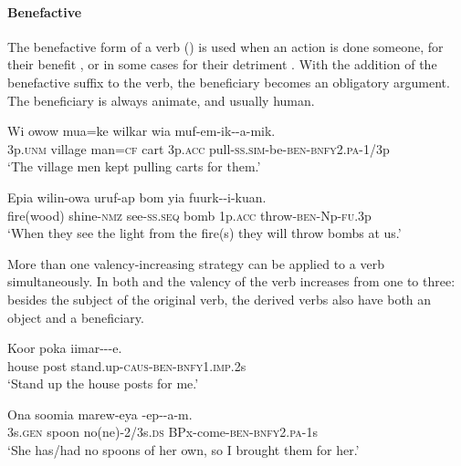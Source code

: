 \paragraph{Benefactive}\label{sec:3.8.4.3.2}
{}
The benefactive form of a verb () is used when an action is done someone, for their benefit , or in some cases for their detriment . With the addition of the benefactive suffix to the verb, the beneficiary becomes an obligatory argument. The beneficiary is always animate, and usually human. 

\ea%
\label{ex:3:x1004}
\gll Wi owow mua=ke wilkar wia muf-em-ik--a-mik.\\
3p.\textsc{unm} village man=\textsc{cf} cart 3p.\textsc{acc} pull-\textsc{ss}.\textsc{sim}-be-\textsc{ben}-\textsc{bnfy}2.\textsc{pa}-1/3p\\
\glt`The village men kept pulling carts for them.'
\z

\ea%
\label{ex:3:x1005}
\gll Epia wilin-owa uruf-ap bom yia fuurk--i-kuan.\\
fire(wood) shine-\textsc{nmz} see-\textsc{ss}.\textsc{seq} bomb 1p.\textsc{acc} throw-\textsc{ben}-Np-\textsc{fu}.3p\\
\glt`When they see the light from the fire(s) they will throw bombs at us.'
\z

More than one valency-increasing strategy can be applied to a verb simultaneously. In both  and  the valency of the verb increases from one to three: besides the subject of the original verb, the derived verbs also have both an object and a beneficiary.

\ea%
\label{ex:3:x1007}
\gll Koor poka iimar---e. \\
house post stand.up-\textsc{caus}-\textsc{ben}-\textsc{bnfy}1.\textsc{imp}.2s\\
\glt`Stand up the house posts for me.'
\z

\ea%
\label{ex:3:x1008}
\gll Ona soomia marew-eya -ep--a-m. \\
3s.\textsc{gen} spoon no(ne)-2/3s.\textsc{ds} BPx-come-\textsc{ben}-\textsc{bnfy}2.\textsc{pa}-1s\\
\glt`She has/had no spoons of her own, so I brought them for her.'
\z

